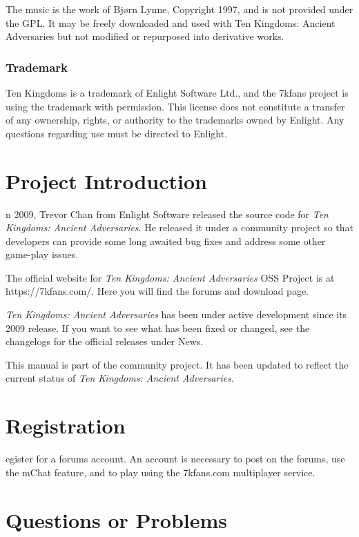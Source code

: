 \documentclass[openany]{book}
\begin{document}
The music is the work of Bjørn Lynne, Copyright 1997, and is not provided under the GPL. It may be freely downloaded and used with Ten Kingdoms: Ancient Adversaries but not modified or repurposed into derivative works.

\subsubsection*{Trademark}

Ten Kingdoms is a trademark of Enlight Software Ltd., and the 7kfans project is using the trademark with permission. This license does not constitute a transfer of any ownership, rights, or authority to the trademarks owned by Enlight. Any questions regarding use must be directed to Enlight.

\clearpage

\section*{Project Introduction}

n 2009, Trevor Chan from Enlight Software released the source code for \textit{Ten Kingdoms: Ancient Adversaries}. He released it under a community project so that developers can provide some long awaited bug fixes and address some other game-play issues.

The official website for \textit{Ten Kingdoms: Ancient Adversaries} OSS Project is at https://7kfans.com/. Here you will find the forums and download page.

\textit{Ten Kingdoms: Ancient Adversaries} has been under active development since its 2009 release. If you want to see what has been fixed or changed, see the changelogs for the official releases under News.

This manual is part of the community project. It has been updated to reflect the current status of \textit{Ten Kingdoms: Ancient Adversaries}.

\section*{Registration}


egister for a forums account. An account is necessary to post on the forums, use the mChat feature, and to play using the 7kfans.com multiplayer service.

\section*{Questions or Problems}
\end{document}
